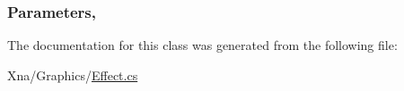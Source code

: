 \subsubsection[{Parameters}]{ Parameters\hspace{0.3cm}{\ttfamily [get]}, {\ttfamily [set]}}\label{classMicrosoft_1_1Xna_1_1Framework_1_1Graphics_1_1Effect_a3c1fe26f520d18998ece7781facaef1d}


The documentation for this class was generated from the following file\+:\begin{DoxyCompactItemize}
\item 
Xna/\+Graphics/\hyperlink{Effect_8cs}{Effect.\+cs}\end{DoxyCompactItemize}
